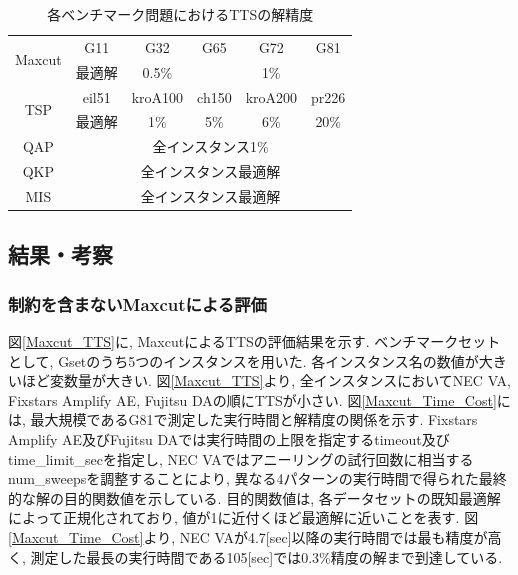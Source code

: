 \documentclass[submit,techrep,noauthor]{ipsj}
\begin{document}
\begin{table}[tb]
\centering
  \caption{各ベンチマーク問題におけるTTSの解精度}
    \begin{tabular}{|c||c|c|c|c|c|}
      \hline
      \multirow{2}{*}{Maxcut} & G11 & G32 & G65 & G72 & G81\\
      \cline{2-2} \cline{3-3} \cline{4-4} \cline{5-5} \cline{6-6}
                              & 最適解 & 0.5\% & \multicolumn{3}{|c|}{1\%}\\ \hline
      \multirow{2}{*}{TSP} & eil51 & kroA100 & ch150 & kroA200 & pr226\\
      \cline{2-2} \cline{3-3} \cline{4-4} \cline{5-5} \cline{6-6}
                              & 最適解 & 1\% & 5\% & 6\% & 20\%\\ \hline
      QAP                     & \multicolumn{5}{|c|}{全インスタンス1\%}\\ \hline
      QKP                     & \multicolumn{5}{|c|}{全インスタンス最適解}\\ \hline
      MIS                     & \multicolumn{5}{|c|}{全インスタンス最適解}\\ \hline
    \end{tabular}
\label{table_target}
\end{table}

\subsection{結果・考察}

\subsubsection{制約を含まないMaxcutによる評価}

図\ref{Maxcut_TTS}に, MaxcutによるTTSの評価結果を示す. ベンチマークセットとして, Gset\cite{gset}のうち5つのインスタンスを用いた. 各インスタンス名の数値が大きいほど変数量が大きい. 図\ref{Maxcut_TTS}より, 全インスタンスにおいてNEC VA, Fixstars Amplify AE, Fujitsu DAの順にTTSが小さい. 図\ref{Maxcut_Time_Cost}には, 最大規模であるG81で測定した実行時間と解精度の関係を示す. Fixstars Amplify AE及びFujitsu DAでは実行時間の上限を指定するtimeout及びtime\_limit\_secを指定し, NEC VAではアニーリングの試行回数に相当するnum\_sweepsを調整することにより, 異なる4パターンの実行時間で得られた最終的な解の目的関数値を示している. 目的関数値は, 各データセットの既知最適解によって正規化されており, 値が1に近付くほど最適解に近いことを表す. 図\ref{Maxcut_Time_Cost}より, NEC VAが4.7[sec]以降の実行時間では最も精度が高く, 測定した最長の実行時間である105[sec]では0.3\%精度の解まで到達している. 
\end{document}
